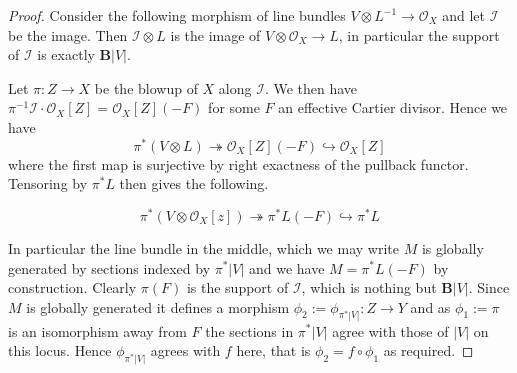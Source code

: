 \documentclass[a4paper,12pt]{book}
\newcommand{\BB}{\mathbf{B}}
\newcommand{\ox}{\mathcal{O}_{X}}
\begin{document}
\begin{proof}
	
	Consider the following morphism of line bundles
	$V \otimes L^{-1} \to \ox$
	and let $\mathcal{I}$ be the image. Then $\mathcal{I} \otimes L$ is the image of $V \otimes \ox \to L$, in particular the support of $\mathcal{I}$ is exactly $\BB|V|$.
	
	Let $\pi:Z \to X$ be the blowup of $X$ along $\mathcal{I}$. We then have $\pi^{-1}\mathcal{I}\cdot \ox[Z]=\ox[Z](-F)$ for some $F$ an effective Cartier divisor. Hence we have
	\[\pi^{*}(V\otimes L) \twoheadrightarrow \ox[Z](-F) \hookrightarrow \ox[Z] \]
	where the first map is surjective by right exactness of the pullback functor. Tensoring by $\pi^{*}L$ then gives the following.
	
	\[\pi^{*}(V\otimes \ox[z]) \twoheadrightarrow \pi^{*}L(-F) \hookrightarrow \pi^{*}L \]
	
	In particular the line bundle in the middle, which we may write $M$ is globally generated by sections indexed by $\pi^{*}|V|$ and we have $M=\pi^{*}L(-F)$ by construction. Clearly $\pi(F)$ is the support of $\mathcal{I}$, which is nothing but $\BB|V|$. Since $M$ is globally generated it defines a morphism $\phi_{2}:=\phi_{\pi^{*}|V|}:Z \to Y$ and as $\phi_{1}:=\pi$ is an isomorphism away from $F$ the sections in $\pi^{*}|V|$ agree with those of $|V|$ on this locus. Hence $\phi_{\pi^{*}|V|}$ agrees with $f$ here, that is $\phi_{2}=f\circ \phi_{1}$ as required. 
\end{proof}

%	
%	
%
%	
%	
%	
%	
%	
\end{document}
